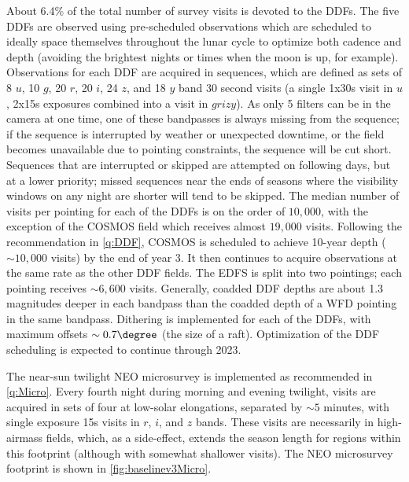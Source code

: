 \hangindent=0.7cm About 6.4\% of the total number of survey visits is devoted to the DDFs. The five DDFs are observed using pre-scheduled observations which are scheduled to ideally space themselves throughout the lunar cycle to optimize both cadence and depth (avoiding the brightest nights or times when the moon is up, for example). Observations for each DDF are acquired in sequences, which are defined as sets of 8 $u$, 10 $g$, 20 $r$, 20 $i$, 24 $z$, and 18 $y$ band 30 second visits (a single 1x30s visit in $u$, 2x15s exposures combined into a visit in $grizy$). As only 5 filters can be in the camera at one time, one of these bandpasses is always missing from the sequence; if the sequence is interrupted by weather or unexpected downtime, or the field becomes unavailable due to pointing constraints, the sequence will be cut short. Sequences that are interrupted or skipped are attempted on following days, but at a lower priority; missed sequences near the ends of seasons where the visibility windows on any night are shorter will tend to be skipped. The median number of visits per pointing for each of the DDFs is on the order of $10,000$, with the exception of the COSMOS field which receives almost $19,000$ visits. Following the recommendation in \autoref{q:DDF}, COSMOS is scheduled to achieve 10-year depth ($\sim10,000$ visits) by the end of year 3. It then continues to acquire observations at the same rate as the other DDF fields. The EDFS is split into two pointings; each pointing receives $\sim6,600$ visits. Generally, coadded DDF depths are about 1.3 magnitudes deeper in each bandpass than the coadded depth of a WFD pointing in the same bandpass. Dithering is implemented for each of the DDFs, with maximum offsets $\sim0.7\degree$ (the size of a raft). Optimization of the DDF scheduling is expected to continue through 2023.

\hangindent=0.7cm The near-sun twilight NEO microsurvey is implemented as recommended in \autoref{q:Micro}. Every fourth night during morning and evening twilight, visits are acquired in sets of four at low-solar elongations, separated by $\sim5$ minutes, with single exposure 15s visits in $r$, $i$, and $z$ bands. These visits are necessarily in high-airmass fields, which, as a side-effect, extends the season length for regions within this footprint (although with somewhat shallower visits). The NEO microsurvey footprint is shown in \autoref{fig:baselinev3Micro}.

